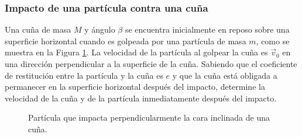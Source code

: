 \subsubsection{Impacto de una partícula contra una cuña}

Una cuña de masa $M$ y ángulo $\beta$ se encuentra inicialmente en reposo sobre una superficie horizontal cuando es golpeada por una partícula de masa $m$, como se muestra en la Figura \ref{fig:c3_e01_p17_cuna}. La velocidad de la partícula al golpear la cuña es $\vec{v}_0$ en una dirección perpendicular a la superficie de la cuña. Sabiendo que el coeficiente de restitución entre la partícula y la cuña es $e$ y que la cuña está obligada a permanecer en la superficie horizontal después del impacto, determine la velocidad de la cuña y de la partícula inmediatamente después del impacto.

\begin{figure}[!ht]
    \centering
    \caption{Partícula que impacta perpendicularmente la cara inclinada de una cuña.}
    \label{fig:c3_e01_p17_cuna}
\end{figure}

